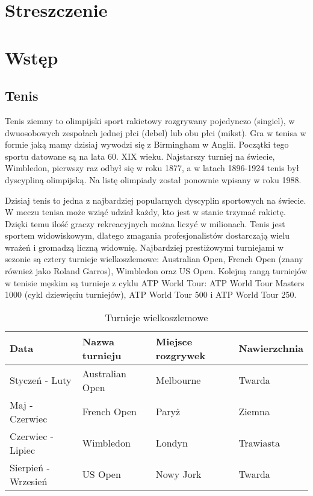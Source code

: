 


\maketitle
\tableofcontents

\chapter{Streszczenie}

\chapter{Wstęp}

\section{Tenis}
Tenis ziemny to olimpijski sport rakietowy rozgrywany pojedynczo (singiel), w dwuosobowych zespołach jednej płci (debel) lub obu płci (mikst). Gra w tenisa w formie jaką mamy dzisiaj wywodzi się z Birmingham w Anglii. Początki tego sportu datowane są na lata 60. XIX wieku. Najstarszy turniej na świecie, Wimbledon, pierwszy raz odbył się w roku 1877, a w latach 1896-1924 tenis był dyscypliną olimpijską. Na listę olimpiady został ponownie wpisany w roku 1988.

Dzisiaj tenis to jedna z najbardziej popularnych dyscyplin sportowych na świecie. W meczu tenisa może wziąć udział każdy, kto jest w stanie trzymać rakietę. Dzięki temu ilość graczy rekreacyjnych można liczyć w milionach. Tenis jest sportem widowiskowym, dlatego zmagania profesjonalistów dostarczają wielu wrażeń i gromadzą liczną widownię. Najbardziej prestiżowymi turniejami w sezonie są cztery turnieje wielkoszlemowe: Australian Open, French Open (znany również jako Roland Garros), Wimbledon oraz US Open. Kolejną rangą turniejów w tenisie męskim są turnieje z cyklu ATP World Tour: ATP World Tour Masters 1000 (cykl dziewięciu turniejów), ATP World Tour 500 i ATP World Tour 250. 

\begin{table}[H]
\centering
\caption{Turnieje wielkoszlemowe}
\label{my-label}
\begin{tabular}{|l|l|l|l|}
\hline
\textbf{Data}       & \textbf{Nazwa turnieju}     & \textbf{Miejsce rozgrywek} & \textbf{Nawierzchnia} \\ \hline
Styczeń - Luty      & Australian Open             & Melbourne                  & Twarda                \\ \hline
Maj - Czerwiec      & French Open  				  & Paryż                      & Ziemna                \\ \hline
Czerwiec - Lipiec   & Wimbledon                   & Londyn                     & Trawiasta             \\ \hline
Sierpień - Wrzesień & US Open                     & Nowy Jork                  & Twarda                \\ \hline
\end{tabular}
\end{table}

